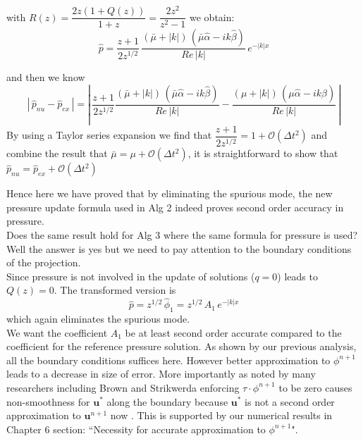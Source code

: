 with $R(z) = \dfrac{2z(1+Q(z))}{1+z} = \dfrac{2z^2}{z^2 - 1}$ we obtain:\\

\begin{equation}
\hat{p} = \dfrac{z+1}{2z^{1/2}}\,\dfrac{(\bar{\mu} + |k|)\,(\bar{\mu} \hat{\alpha}  -ik \hat{\beta})}{Re\,|k|}\,e^{-|k|x}
\end{equation}

and then we know
\begin{equation*}
|\,\hat{p}_{nu} - \hat{p}_{ex}\,| =|\, \dfrac{z+1}{2 z^{1/2}} \dfrac{(\bar{\mu} + |k|)\,(\bar{\mu} \hat{\alpha}  -ik \hat{\beta})}{Re\,|k|} - \dfrac{(\mu + |k|)\,(\mu \hat{\alpha}  -ik \hat{\beta})}{Re\,|k|}\,|
\end{equation*}
By using a Taylor series expansion we find that $\dfrac{z+1}{2z^{1/2}} = 1 + \mathcal{O}(\Delta t^2)$ and combine the result that $\bar{\mu} = \mu + \mathcal{O}(\Delta t^2)$, it is straightforward to show that $\hat{p}_{nu} = \hat{p}_{ex} + \mathcal{O}(\Delta t^2)$

Hence here we have proved that by eliminating the spurious mode, the new pressure update formula used in Alg 2 indeed proves second order accuracy in pressure.\\

Does the same result hold for Alg 3 where the same formula for pressure is used? Well the answer is yes but we need to pay attention to the boundary conditions of the projection.\\

Since pressure is not involved in the update of solutions ($q = 0$) leads to $Q(z) = 0$. The transformed version is
\begin{equation}
\hat{p} = z^{1/2}\,\hat{\phi}_1 = z^{1/2}\,A_1\,e^{-|k|x}
\end{equation}
which again eliminates the spurious mode.\\

We want the coefficient $A_1$ be at least second order accurate compared to the coefficient for the reference pressure solution. As shown by our previous analysis, all the boundary conditions suffices here. However better approximation to $\phi^{n+1}$ leads to a decrease in size of error. More importantly as noted by many researchers including Brown and Strikwerda enforcing $\textbf{$\tau$}\cdot\phi^{n+1}$ to be zero causes non-smoothness for $\textbf{u}^*$ along the boundary because $\textbf{u}^*$ is not a second order approximation to $\textbf{u}^{n+1}$ now \cite{strikwerda1999accuracy}. This is supported by our numerical results in Chapter 6 section: ``Necessity for accurate approximation to $\phi^{n+1}$".\\

